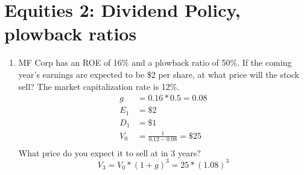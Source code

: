 \documentclass[11pt]{article}
\theoremstyle{definition}
\begin{document}
\section{Equities 2: Dividend Policy, plowback ratios}

\begin{shaded}
    \begin{enumerate}
        \item MF Corp has an ROE of 16\% and a plowback ratio of 50\%.   If the coming 
        year's earnings are expected to be \$2 per share, at what price will the stock 
        sell? The market capitalization rate is 12\%.  
        \begin{align*}
        g &= 0.16*0.5=0.08\\
        E_1 &= \$2 \\
        D_1 &= \$1 \\
        V_0 &= \frac{1}{0.12-0.08} = \$25\\
        \end{align*}
         What price do you expect it 
        to sell at in 3 years?        
        \[V_3 = V_0*(1+g)^3 = 25*(1.08)^3\]
        
    \end{enumerate}

\end{shaded}
\end{document}
